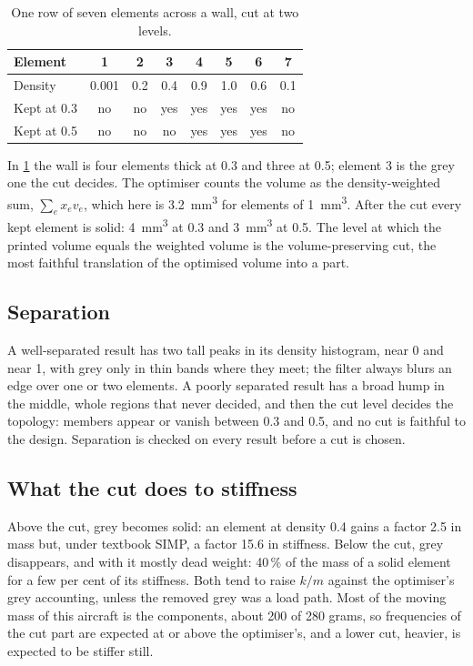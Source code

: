 \begin{table}[htbp]
\centering\small
\caption{One row of seven elements across a wall, cut at two levels.}\label{tab:to-iso}
\begin{tabular}{@{}lccccccc@{}}
\toprule
Element & 1 & 2 & 3 & 4 & 5 & 6 & 7\\
\midrule
Density & 0.001 & 0.2 & 0.4 & 0.9 & 1.0 & 0.6 & 0.1\\
Kept at 0.3 & no & no & yes & yes & yes & yes & no\\
Kept at 0.5 & no & no & no & yes & yes & yes & no\\
\bottomrule
\end{tabular}
\end{table}

In \cref{tab:to-iso} the wall is four elements thick at 0.3 and three at 0.5; element 3 is the grey one the cut decides. The optimiser counts the volume as the density-weighted sum, $\sum_e x_e v_e$, which here is \SI{3.2}{mm^3} for elements of \SI{1}{mm^3}. After the cut every kept element is solid: \SI{4}{mm^3} at 0.3 and \SI{3}{mm^3} at 0.5. The level at which the printed volume equals the weighted volume is the volume-preserving cut, the most faithful translation of the optimised volume into a part.

\subsection{Separation}

A well-separated result has two tall peaks in its density histogram, near 0 and near 1, with grey only in thin bands where they meet; the filter always blurs an edge over one or two elements. A poorly separated result has a broad hump in the middle, whole regions that never decided, and then the cut level decides the topology: members appear or vanish between 0.3 and 0.5, and no cut is faithful to the design. Separation is checked on every result before a cut is chosen.

\subsection{What the cut does to stiffness}

Above the cut, grey becomes solid: an element at density 0.4 gains a factor 2.5 in mass but, under textbook SIMP, a factor 15.6 in stiffness. Below the cut, grey disappears, and with it mostly dead weight: 40\,\% of the mass of a solid element for a few per cent of its stiffness. Both tend to raise $k/m$ against the optimiser's grey accounting, unless the removed grey was a load path. Most of the moving mass of this aircraft is the components, about 200 of 280 grams, so frequencies of the cut part are expected at or above the optimiser's, and a lower cut, heavier, is expected to be stiffer still.

